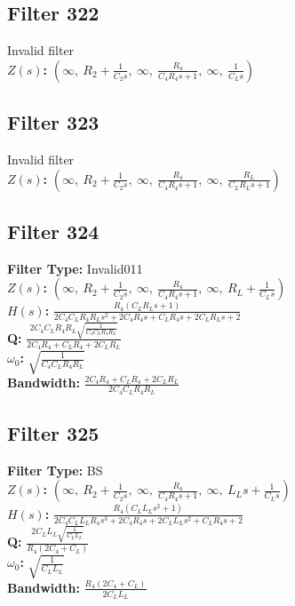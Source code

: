 \documentclass{article}
\begin{document}
\subsection*{Filter 322}
Invalid filter \\ 
\textbf{$Z(s)$:} $\left( \infty, \  R_{2} + \frac{1}{C_{2} s}, \  \infty, \  \frac{R_{4}}{C_{4} R_{4} s + 1}, \  \infty, \  \frac{1}{C_{L} s}\right)$ \\ 
\subsection*{Filter 323}
Invalid filter \\ 
\textbf{$Z(s)$:} $\left( \infty, \  R_{2} + \frac{1}{C_{2} s}, \  \infty, \  \frac{R_{4}}{C_{4} R_{4} s + 1}, \  \infty, \  \frac{R_{L}}{C_{L} R_{L} s + 1}\right)$ \\ 
\subsection*{Filter 324}
\textbf{Filter Type:} Invalid011 \\ 
\textbf{$Z(s)$:} $\left( \infty, \  R_{2} + \frac{1}{C_{2} s}, \  \infty, \  \frac{R_{4}}{C_{4} R_{4} s + 1}, \  \infty, \  R_{L} + \frac{1}{C_{L} s}\right)$ \\ 
\textbf{$H(s)$:} $\frac{R_{4} \left(C_{L} R_{L} s + 1\right)}{2 C_{4} C_{L} R_{4} R_{L} s^{2} + 2 C_{4} R_{4} s + C_{L} R_{4} s + 2 C_{L} R_{L} s + 2}$ \\ 
\textbf{Q:} $\frac{2 C_{4} C_{L} R_{4} R_{L} \sqrt{\frac{1}{C_{4} C_{L} R_{4} R_{L}}}}{2 C_{4} R_{4} + C_{L} R_{4} + 2 C_{L} R_{L}}$ \\ 
\textbf{$\omega_0$:} $\sqrt{\frac{1}{C_{4} C_{L} R_{4} R_{L}}}$ \\ 
\textbf{Bandwidth:} $\frac{2 C_{4} R_{4} + C_{L} R_{4} + 2 C_{L} R_{L}}{2 C_{4} C_{L} R_{4} R_{L}}$ \\ 
\subsection*{Filter 325}
\textbf{Filter Type:} BS \\ 
\textbf{$Z(s)$:} $\left( \infty, \  R_{2} + \frac{1}{C_{2} s}, \  \infty, \  \frac{R_{4}}{C_{4} R_{4} s + 1}, \  \infty, \  L_{L} s + \frac{1}{C_{L} s}\right)$ \\ 
\textbf{$H(s)$:} $\frac{R_{4} \left(C_{L} L_{L} s^{2} + 1\right)}{2 C_{4} C_{L} L_{L} R_{4} s^{3} + 2 C_{4} R_{4} s + 2 C_{L} L_{L} s^{2} + C_{L} R_{4} s + 2}$ \\ 
\textbf{Q:} $\frac{2 C_{L} L_{L} \sqrt{\frac{1}{C_{L} L_{L}}}}{R_{4} \left(2 C_{4} + C_{L}\right)}$ \\ 
\textbf{$\omega_0$:} $\sqrt{\frac{1}{C_{L} L_{L}}}$ \\ 
\textbf{Bandwidth:} $\frac{R_{4} \left(2 C_{4} + C_{L}\right)}{2 C_{L} L_{L}}$ \\ 
\end{document}
